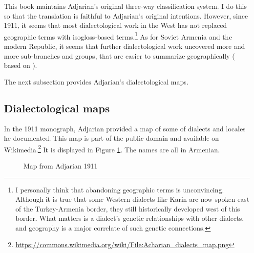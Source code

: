 This book maintains Adjarian's original three-way classification system. I do this so that the translation is faithful to Adjarian's original intentions. However, since 1911, it seems that most dialectological work in the West has not replaced geographic terms with isogloss-based terms.\footnote{I personally think that abandoning geographic terms is unconvincing. Although it is true that some Western dialects like Karin are now spoken east of the Turkey-Armenia border, they still historically developed west of this border. What matters is a dialect's genetic relationships with other dialects, and geography is a major correlate of such genetic connections. } As for Soviet Armenia and the modern Republic, it seems that further dialectological work uncovered more and more sub-branches and groups, that are easier to summarize geographically (\citealt[\S 4]{Martirosyan-2019-Armeniandialects} based on \citealt{Jahukyan-1972-ArmenianDiaolectology}). 

The next subsection provides Adjarian's dialectological maps.

\subsection{Dialectological maps}\label{section:HossepIntro:maps}


In the 1911 monograph, Adjarian provided a map of some of dialects and locales he documented. This map is part of the public domain and available on Wikimedia.\footnote{\url{https://commons.wikimedia.org/wiki/File:Acharian_dialects_map.png}} It is displayed in Figure \ref{map:Adjarian1911}. The names are all in Armenian. 

\begin{figure}[H]
	\caption{Map from Adjarian 1911}
\label{map:Adjarian1911}
\end{figure}




